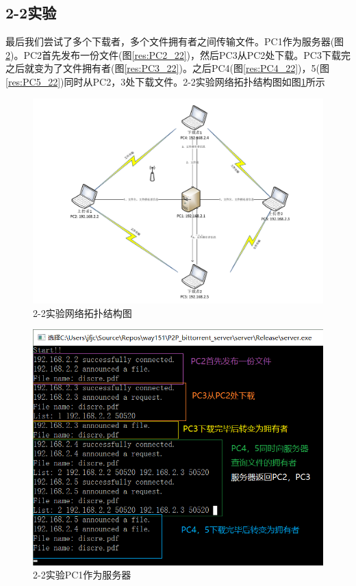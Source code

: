 \documentclass[thesis]{thesis}
\begin{document}
	\subsection{2-2实验}
	最后我们尝试了多个下载者，多个文件拥有者之间传输文件。PC1作为服务器(图\ref{res:PC1_22})。PC2首先发布一份文件(图\ref{res:PC2_22})，然后PC3从PC2处下载。PC3下载完之后就变为了文件拥有者(图\ref{res:PC3_22})。之后PC4(图\ref{res:PC4_22})，5(图\ref{res:PC5_22})同时从PC2，3处下载文件。2-2实验网络拓扑结构图如图\ref{res:22}所示
	\begin{figure}[H]
		\centering
		\includegraphics[width=0.8\linewidth]{fig/2-2.pdf}
		\caption{2-2实验\quad 网络拓扑结构图}
		\label{res:22}
	\end{figure}
	\begin{minipage}{0.5\linewidth}
	\begin{figure}[H]
		\centering
		\includegraphics[width=\linewidth]{fig/PC1_22.png}
		\caption{2-2实验\quad PC1作为服务器}
		\label{res:PC1_22}
	\end{figure}
	\end{minipage}
\end{document}
